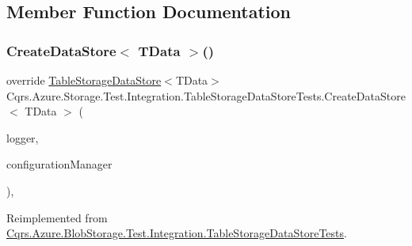 \subsection{Member Function Documentation}
\mbox{\label{classCqrs_1_1Azure_1_1Storage_1_1Test_1_1Integration_1_1TableStorageDataStoreTests_a4c23960b33f58ea56707d736616a9f53}} 
\subsubsection{\texorpdfstring{Create\+Data\+Store$<$ T\+Data $>$()}{CreateDataStore< TData >()}}
{\footnotesize\ttfamily override \hyperlink{classCqrs_1_1Azure_1_1BlobStorage_1_1DataStores_1_1TableStorageDataStore}{Table\+Storage\+Data\+Store}$<$T\+Data$>$ Cqrs.\+Azure.\+Storage.\+Test.\+Integration.\+Table\+Storage\+Data\+Store\+Tests.\+Create\+Data\+Store$<$ T\+Data $>$ (\begin{DoxyParamCaption}\item[{I\+Logger}]{logger,  }\item[{\hyperlink{interfaceCqrs_1_1Configuration_1_1IConfigurationManager}{I\+Configuration\+Manager}}]{configuration\+Manager }\end{DoxyParamCaption})\hspace{0.3cm}{\ttfamily [protected]}, {\ttfamily [virtual]}}



Reimplemented from \hyperlink{classCqrs_1_1Azure_1_1BlobStorage_1_1Test_1_1Integration_1_1TableStorageDataStoreTests_a76d6ef854f24e39f80de66e86cfa967c}{Cqrs.\+Azure.\+Blob\+Storage.\+Test.\+Integration.\+Table\+Storage\+Data\+Store\+Tests}.

